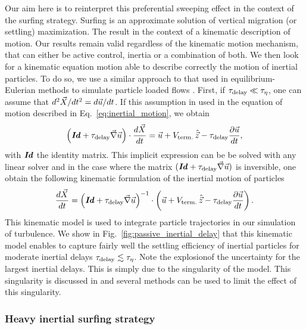 Our aim here is to reinterpret this preferential sweeping effect in the context of the surfing strategy.
Surfing is an approximate solution of vertical migration (or settling) maximization. 
The result in the context of a kinematic description of motion.
Our results remain valid regardless of the kinematic motion mechanism, that can either be active control, inertia or a combination of both.
We then look for a kinematic equation motion able to describe correctly the motion of inertial particles.
To do so, we use a similar approach to that used in equilibrium-Eulerian methods to simulate particle loaded flows \citep{ferry2001fast, ferry2003locally, balachandar2010turbulent, cerminara2016ashee}.
First, if $\tau_{\mathrm{delay}} \ll \tau_{\eta}$, one can assume that $d^2 \vec{X} / dt^2 = d \vec{u} / dt$.
If this assumption in used in the equation of motion described in Eq.~\eqref{eq:inertial_motion}, we obtain
\begin{equation}\label{eq:inertial_motion_kinematic}
	\left( \boldsymbol{\mathit{Id}} + \tau_{\mathrm{delay}} \vec{\nabla} \vec{u} \right) \cdot \frac{d \vec{X}}{dt} = \vec{u} + V_{\mathrm{term.}} \, \hat{\vec{z}} - \tau_{\mathrm{delay}} \frac{\partial \vec{u}}{dt},
\end{equation}
with $\boldsymbol{\mathit{Id}}$ the identity matrix.
This implicit expression can be be solved with any linear solver and in the case where the matrix $( \boldsymbol{\mathit{Id}} + \tau_{\mathrm{delay}} \vec{\nabla} \vec{u})$ is inversible, one obtain the following kinematic formulation of the inertial motion of particles
\begin{equation}\label{eq:inertial_motion_kinematic_inverse}
	 \frac{d \vec{X}}{dt} = \left( \boldsymbol{\mathit{Id}} + \tau_{\mathrm{delay}} \vec{\nabla} \vec{u} \right)^{-1} \cdot \left( \vec{u} + V_{\mathrm{term.}} \, \hat{\vec{z}} - \tau_{\mathrm{delay}} \frac{\partial \vec{u}}{dt} \right).
\end{equation}
This kinematic model is used to integrate particle trajectories in our simulation of turbulence.
We show in Fig.~\ref{fig:passive_inertial_delay} that this kinematic model enables to capture fairly well the settling efficiency of inertial particles for moderate inertial delays $\tau_{\mathrm{delay}} \lesssim \tau_{\eta}$.
Note the explosionof the uncertainty for the largest inertial delays.
This is simply due to the singularity of the model.
This singularity is discussed in \citep{ferry2001fast} and several methods can be used to limit the effect of this singularity.

\subsubsection{Heavy inertial surfing strategy}

